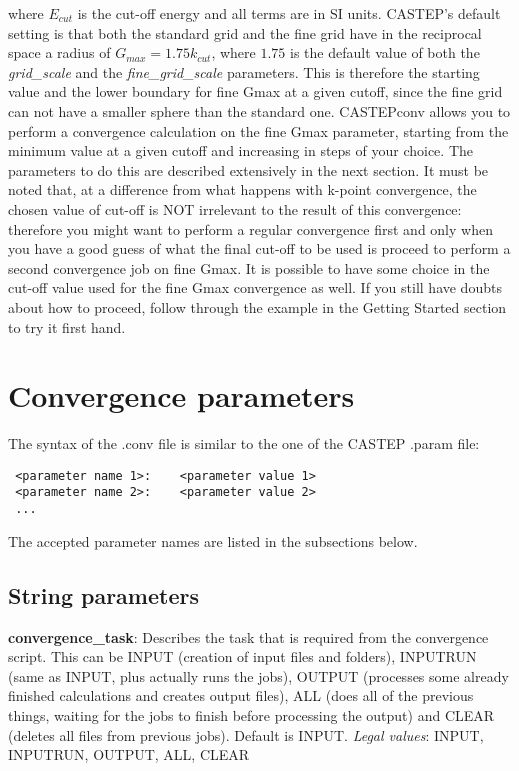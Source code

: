 \documentclass[10pt]{article}
\begin{document}
where $E_{cut}$ is the cut-off energy and all terms are in SI units. CASTEP's default setting is that both the standard grid and the fine grid have in the reciprocal space a radius of $G_{max} = 1.75k_{cut}$, where $1.75$ is the default value of both the \textit{grid\_scale} and the \textit{fine\_grid\_scale} parameters. This is therefore the starting value and the lower boundary for fine Gmax at a given cutoff, since the fine grid can not have a smaller sphere than the standard one.\newline
CASTEPconv allows you to perform a convergence calculation on the fine Gmax parameter, starting from the minimum value at a given cutoff and increasing in steps of your choice. The parameters to do this are described extensively in the next section. It must be noted that, at a difference from what happens with k-point convergence, the chosen value of cut-off is NOT irrelevant to the result of this convergence: therefore you might want to perform a regular convergence first and only when you have a good guess of what the final cut-off to be used is proceed to perform a second convergence job on fine Gmax. It is possible to have some choice in the cut-off value used for the fine Gmax convergence as well. If you still have doubts about how to proceed, follow through the example in the Getting Started section to try it first hand.

\section{Convergence parameters}

The syntax of the .conv file is similar to the one of the CASTEP .param file:

\begin{lstlisting}
 <parameter name 1>:    <parameter value 1>
 <parameter name 2>:    <parameter value 2>
 ...
\end{lstlisting}

The accepted parameter names are listed in the subsections below.

\subsection{String parameters}

\textbf{convergence\_task}: Describes the task that is required from the 
convergence script. This can be INPUT (creation of input files and folders), 
INPUTRUN (same as INPUT, plus actually runs the jobs), OUTPUT (processes some 
already finished calculations and creates output files), ALL (does all of the 
previous things, waiting for the jobs to finish before processing the output) and CLEAR (deletes all files from previous jobs).\newline
Default is INPUT.\newline
\textit{Legal values}: INPUT, INPUTRUN, OUTPUT, ALL, CLEAR\newline
\end{document}
